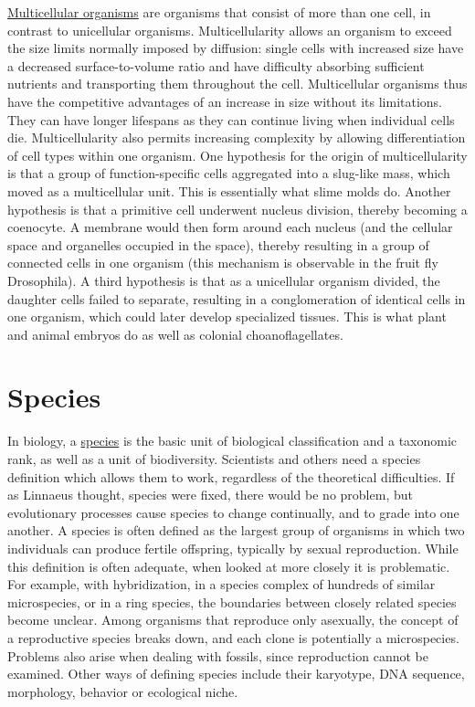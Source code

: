 \href{https://en.wikipedia.org/wiki/Multicellular_organism}{Multicellular
organisms} are organisms that consist of more than one cell, in contrast
to unicellular organisms. Multicellularity allows an organism to exceed
the size limits normally imposed by diffusion: single cells with
increased size have a decreased surface-to-volume ratio and have
difficulty absorbing sufficient nutrients and transporting them
throughout the cell. Multicellular organisms thus have the competitive
advantages of an increase in size without its limitations. They can have
longer lifespans as they can continue living when individual cells die.
Multicellularity also permits increasing complexity by allowing
differentiation of cell types within one organism. One hypothesis for
the origin of multicellularity is that a group of function-specific
cells aggregated into a slug-like mass, which moved as a multicellular
unit. This is essentially what slime molds do. Another hypothesis is
that a primitive cell underwent nucleus division, thereby becoming a
coenocyte. A membrane would then form around each nucleus (and the
cellular space and organelles occupied in the space), thereby resulting
in a group of connected cells in one organism (this mechanism is
observable in the fruit fly Drosophila). A third hypothesis is that as a
unicellular organism divided, the daughter cells failed to separate,
resulting in a conglomeration of identical cells in one organism, which
could later develop specialized tissues. This is what plant and animal
embryos do as well as colonial choanoflagellates.

\section{Species}\label{species}

In biology, a \href{https://en.wikipedia.org/wiki/Species}{species} is
the basic unit of biological classification and a taxonomic rank, as
well as a unit of biodiversity. Scientists and others need a species
definition which allows them to work, regardless of the theoretical
difficulties. If as Linnaeus thought, species were fixed, there would be
no problem, but evolutionary processes cause species to change
continually, and to grade into one another. A species is often defined
as the largest group of organisms in which two individuals can produce
fertile offspring, typically by sexual reproduction. While this
definition is often adequate, when looked at more closely it is
problematic. For example, with hybridization, in a species complex of
hundreds of similar microspecies, or in a ring species, the boundaries
between closely related species become unclear. Among organisms that
reproduce only asexually, the concept of a reproductive species breaks
down, and each clone is potentially a microspecies. Problems also arise
when dealing with fossils, since reproduction cannot be examined. Other
ways of defining species include their karyotype, DNA sequence,
morphology, behavior or ecological niche.

